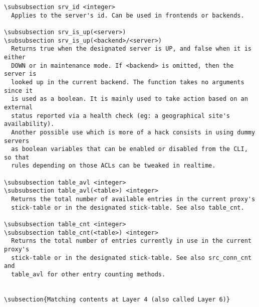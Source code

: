 \begin{verbatim}
\subsubsection srv_id <integer>
  Applies to the server's id. Can be used in frontends or backends.

\subsubsection srv_is_up(<server>)
\subsubsection srv_is_up(<backend>/<server>)
  Returns true when the designated server is UP, and false when it is either
  DOWN or in maintenance mode. If <backend> is omitted, then the server is
  looked up in the current backend. The function takes no arguments since it
  is used as a boolean. It is mainly used to take action based on an external
  status reported via a health check (eg: a geographical site's availability).
  Another possible use which is more of a hack consists in using dummy servers
  as boolean variables that can be enabled or disabled from the CLI, so that
  rules depending on those ACLs can be tweaked in realtime.

\subsubsection table_avl <integer>
\subsubsection table_avl(<table>) <integer>
  Returns the total number of available entries in the current proxy's
  stick-table or in the designated stick-table. See also table_cnt.

\subsubsection table_cnt <integer>
\subsubsection table_cnt(<table>) <integer>
  Returns the total number of entries currently in use in the current proxy's
  stick-table or in the designated stick-table. See also src_conn_cnt and
  table_avl for other entry counting methods.


\subsection{Matching contents at Layer 4 (also called Layer 6)}


\end{verbatim}
